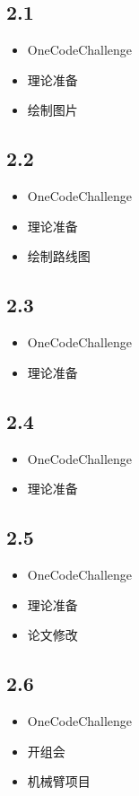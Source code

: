 \documentclass[UTF8]{ctexart}
\begin{document}
\subsection*{2.1}
\begin{itemize}
    \item OneCodeChallenge
    \item 理论准备
    \item 绘制图片
\end{itemize}

\subsection*{2.2}
\begin{itemize}
    \item OneCodeChallenge
    \item 理论准备
    \item 绘制路线图
\end{itemize}

\subsection*{2.3}
\begin{itemize}
    \item OneCodeChallenge
    \item 理论准备
\end{itemize}

\subsection*{2.4}
\begin{itemize}
    \item OneCodeChallenge
    \item 理论准备
\end{itemize}

\subsection*{2.5}
\begin{itemize}
    \item OneCodeChallenge
    \item 理论准备
    \item 论文修改
\end{itemize}

\subsection*{2.6}
\begin{itemize}
    \item OneCodeChallenge
    \item 开组会
    \item 机械臂项目
\end{itemize}
\end{document}
